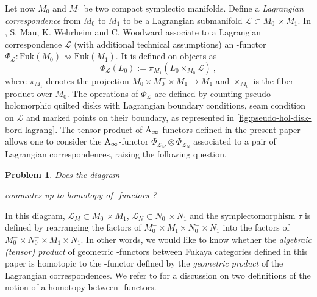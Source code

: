\documentclass[twoside, 11pt]{amsart}
\newtheorem{problem}{Problem}
\theoremstyle{remark}
\begin{document}
Let now $M_0$ and $M_1$ be two compact symplectic manifolds. Define a \emph{Lagrangian correspondence} from $M_0$ to $M_1$ to be a Lagrangian submanifold $\mathcal{L} \subset M_0^{-} \times M_1$.
In \cite{mau-wehrheim-woodward}, S. Mau, K. Wehrheim and C. Woodward associate to a Lagrangian correspondence $\mathcal{L}$ (with additional technical assumptions) an \Ainf -functor $\Phi_{\mathcal{L}} : \mathrm{Fuk}(M_0) \rightsquigarrow \mathrm{Fuk}(M_1)$.  
It is defined on objects as 
\[ \Phi_{\mathcal{L}} (L_0) := \pi_{M_1} ( L_0 \times_{M_0} \mathcal{L} ) \ , \]
where $\pi_{M_1}$ denotes the projection $M_0 \times M_0^{-} \times M_1 \rightarrow M_1$ and $\times_{M_0}$ is the fiber product over $M_0$. The operations of $\Phi_{\mathcal{L}}$ are defined by counting pseudo-holomorphic quilted disks with Lagrangian boundary conditions, seam condition on $\mathcal{L}$ and marked points on their boundary, as represented in \cref{fig:pseudo-hol-disk-bord-lagrang}. 
The tensor product of $\mathrm{A}_\infty$-functors defined in the present paper allows one to consider the $\mathrm{A}_\infty$-functor $\Phi_{\mathcal{L}_M} \otimes \Phi_{\mathcal{L}_N}$ associated to a pair of Lagrangian correspondences, raising the following question. 

\begin{problem} \label{problem}
Does the diagram
\begin{center} 
\end{center}
commutes up to homotopy of \Ainf -functors ? 
\end{problem}

In this diagram, $\mathcal{L}_M \subset M_0^{-} \times M_1$, $\mathcal{L}_N \subset N_0^- \times N_1$ and the symplectomorphism $\tau$ is defined by rearranging the factors of $M_0^{-} \times M_1 \times N_0^- \times N_1$ into the factors of $M_0^{-} \times N_0^- \times M_1 \times N_1$. In other words, we would like to know whether the \emph{algebraic (tensor) product} of geometric \Ainf -functors between Fukaya categories defined in this paper is homotopic to the \Ainf -functor defined by the \emph{geometric product} of the Lagrangian correspondences. 
We refer to \cite[Section 13]{fukaya-unobstructed} for a discussion on two definitions of the notion of a homotopy between \Ainf -functors.
\end{document}
